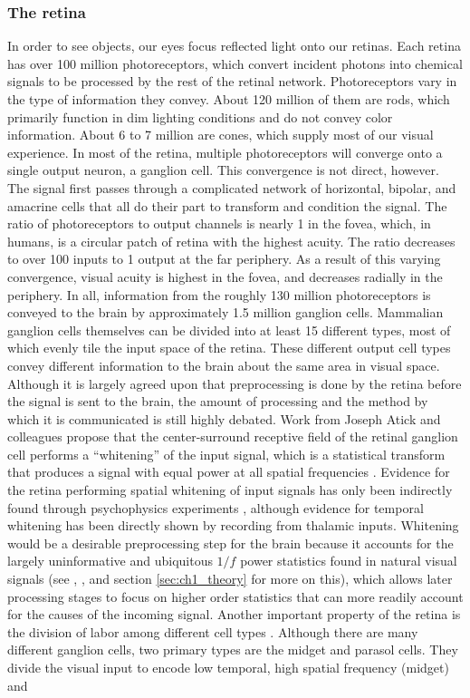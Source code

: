 \subsubsection{The retina}
In order to see objects, our eyes focus reflected light onto our retinas. Each retina has over 100 million photoreceptors, which convert incident photons into chemical signals to be processed by the rest of the retinal network. Photoreceptors vary in the type of information they convey. About 120 million of them are rods, which primarily function in dim lighting conditions and do not convey color information. About 6 to 7 million are cones, which supply most of our visual experience. In most of the retina, multiple photoreceptors will converge onto a single output neuron, a ganglion cell. This convergence is not direct, however. The signal first passes through a complicated network of horizontal, bipolar, and amacrine cells that all do their part to transform and condition the signal. The ratio of photoreceptors to output channels is nearly 1 in the fovea, which, in humans, is a circular patch of retina with the highest acuity. The ratio decreases to over 100 inputs to 1 output at the far periphery. As a result of this varying convergence, visual acuity is highest in the fovea, and decreases radially in the periphery. In all, information from the roughly 130 million photoreceptors is conveyed to the brain by approximately 1.5 million ganglion cells. Mammalian ganglion cells themselves can be divided into at least 15 different types, most of which evenly tile the input space of the retina. These different output cell types convey different information to the brain about the same area in visual space. Although it is largely agreed upon that preprocessing is done by the retina before the signal is sent to the brain, the amount of processing and the method by which it is communicated is still highly debated. Work from Joseph Atick and colleagues propose that the center-surround receptive field of the retinal ganglion cell performs a ``whitening'' of the input signal, which is a statistical transform that produces a signal with equal power at all spatial frequencies \parencite{atick1990towards, atick1992what}. Evidence for the retina performing spatial whitening of input signals has only been indirectly found through psychophysics experiments \parencite{atick1992what}, although evidence for temporal whitening has been directly shown \parencite{dong1995statistics} by recording from thalamic inputs. Whitening would be a desirable preprocessing step for the brain because it accounts for the largely uninformative and ubiquitous $1/f$ power statistics found in natural visual signals (see \parencite{field1999wavelets}, \parencite{field1989statistics}, and section \ref{sec:ch1_theory} for more on this), which allows later processing stages to focus on higher order statistics that can more readily account for the causes of the incoming signal. Another important property of the retina is the division of labor among different cell types \parencite{van1995information}. Although there are many different ganglion cells, two primary types are the midget and parasol cells. They divide the visual input to encode low temporal, high spatial frequency (midget) and 